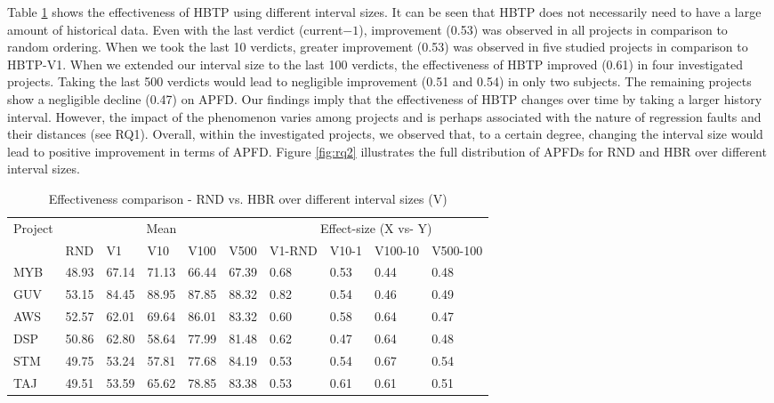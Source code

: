 \documentclass[1p]{elsarticle}
\begin{document}
Table \ref{table:rq2} shows the effectiveness of HBTP using different interval sizes. It can be seen that HBTP does not necessarily need to have a large amount of historical data. Even with the last verdict (current$-1$), improvement (0.53) was observed in all projects in comparison to random ordering. When we took the last 10 verdicts, greater improvement (0.53) was  observed in five studied projects in comparison to HBTP-V1. When we extended our interval size to the last 100 verdicts, the effectiveness of HBTP improved (0.61) in four investigated projects. Taking the last 500 verdicts would lead to negligible improvement (0.51 and 0.54) in only two subjects. The remaining projects show a negligible decline (0.47) on APFD. Our findings imply that the effectiveness of HBTP changes over time by taking a larger history interval. However, the impact of the phenomenon varies among projects and is perhaps associated with the nature of regression faults and their distances (see RQ1). Overall, within the investigated projects, we observed that, to a certain degree, changing the interval size would lead to positive improvement in terms of APFD. Figure \ref{fig:rq2} illustrates the full distribution of APFDs for RND and HBR over different interval sizes.


\begin{table} [H]
\centering
\caption {Effectiveness comparison - RND vs. HBR over different interval sizes (V)}
\label{table:rq2}
  \begin{tabular}{|l|l|l|l|l|l|l|l|l|l|}
    \hline
    \multirow{2}{*}{Project} &
      \multicolumn{5}{c|}{Mean} &
      \multicolumn{4}{c|}{Effect-size (X vs- Y)} \\
    & RND & V1 & V10 & V100 & V500 & V1-RND & V10-1 & V100-10 & V500-100 \\
    \hline
    \hline
	MYB&48.93&67.14&71.13&66.44&67.39&0.68\cellcolor{Gray}&0.53&0.44&0.48 \\
	\hline
	GUV&53.15&84.45&88.95&87.85&88.32&0.82\cellcolor{Gray}&0.54&0.46&0.49 \\
	\hline
	AWS&52.57&62.01&69.64&86.01&83.32&0.60\cellcolor{Gray}&0.58&0.64\cellcolor{Gray}&0.47 \\
	\hline
	DSP&50.86&62.80&58.64&77.99&81.48&0.62\cellcolor{Gray}&0.47&0.64\cellcolor{Gray}&0.48 \\
	\hline
	STM&49.75&53.24&57.81&77.68&84.19&0.53\cellcolor{Gray}&0.54\cellcolor{Gray}&0.67\cellcolor{Gray}&0.54\cellcolor{Gray} \\
	\hline
	TAJ&49.51&53.59&65.62&78.85&83.38&0.53\cellcolor{Gray}&0.61\cellcolor{Gray}&0.61\cellcolor{Gray}&0.51 \cellcolor{Gray}\\
	\hline
  \end{tabular}
\end{table}
\end{document}
